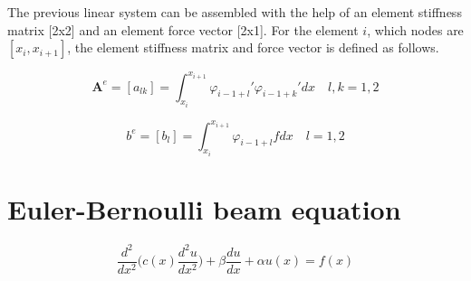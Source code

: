 \documentclass{article}
\begin{document}
\noindent The previous linear system can be assembled with the help of an element stiffness matrix [2x2] and an element force vector [2x1]. For the element $i$, which nodes are $[x_i,x_{i+1}]$, the element stiffness matrix and force vector is defined as follows.

\begin{equation*}
    \textbf{A}^e=[a_{lk}]=\int_{x_i}^{x_{i+1}} \varphi_{i-1+l}' \varphi_{i-1+k}' dx \quad
     l,k=1,2  
\end{equation*}

\begin{equation*}
    b^e=[b_{l}]=\int_{x_i}^{x_{i+1}} \varphi_{i-1+l} f dx \quad
     l=1,2  
\end{equation*}

\section{Euler-Bernoulli beam equation}

\begin{equation}
    \frac{d^2}{dx^2}\Big( c(x) \frac{d^2 u}{dx^2} \Big) + \beta \frac{du}{dx} + \alpha u(x)= f(x)
\end{equation}
\end{document}
